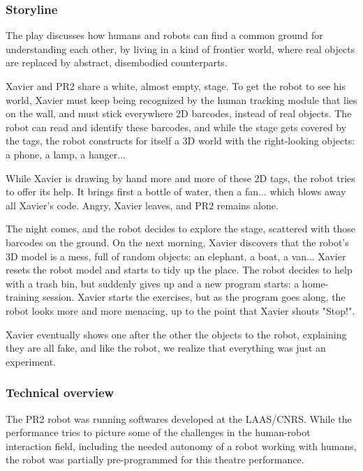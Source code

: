\subsubsection{Storyline}

The play discusses how humans and robots can find a common ground for understanding
each other, by living in a kind of frontier world, where real objects are replaced 
by abstract, disembodied counterparts.

Xavier and PR2 share a white, almost empty, stage. To get the robot to see his
world, Xavier must keep being recognized by the human tracking module that lies
on the wall, and must stick everywhere 2D barcodes, instead of real
objects. The robot can read and identify these barcodes, and while the stage
gets covered by the tags, the robot constructs for itself a 3D world with the
right-looking objects: a phone, a lamp, a hanger...

While Xavier is drawing by hand more and more of these 2D tags, the robot tries
to offer its help. It brings first a bottle of water, then a fan... which blows
away all Xavier's code. Angry, Xavier leaves, and PR2 remains alone.

The night comes, and the robot decides to explore the stage, scattered with
those barcodes on the ground. On the next morning, Xavier discovers that the
robot's 3D model is a mess, full of random objects: an elephant, a boat, a
van... Xavier resets the robot model and starts to tidy up the place. The robot
decides to help with a trash bin, but suddenly gives up and a new program
starts: a home-training session. Xavier starts the exercises, but as the
program goes along, the robot looks more and more menacing, up to the point
that Xavier shouts "Stop!".

Xavier eventually shows one after the other the objects to the robot,
explaining they are all fake, and like the robot, we realize that everything
was just an experiment.

\subsubsection{Technical overview}

The PR2 robot was running softwares developed at the LAAS/CNRS. While the
performance tries to picture some of the challenges in the human-robot
interaction field, including the needed autonomy of a robot working with
humans, the robot was partially pre-programmed for this theatre performance.

